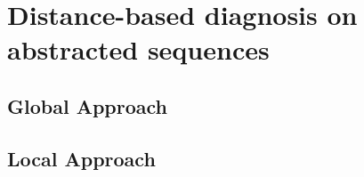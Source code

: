 \section{Distance-based diagnosis on abstracted sequences}
\label{c5:sec-absdiag}



  \subsection{Global Approach}
  \subsection{Local Approach}

